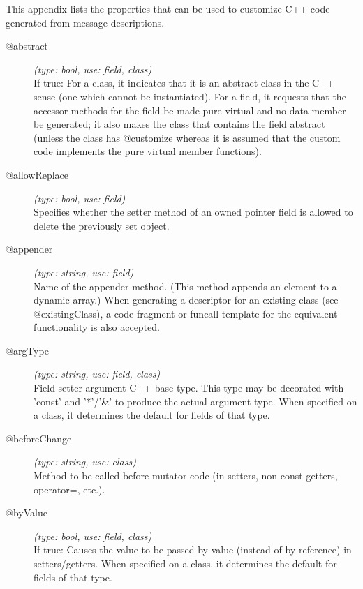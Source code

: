 \label{cha:msg-properties}

This appendix lists the properties that can be used to customize C++ code
generated from message descriptions.

%
%

\begin{description}
\item[@abstract] \textit{(type: bool, use: field, class)} \\
  If true: For a class, it indicates that it is an abstract class in the C++
  sense (one which cannot be instantiated). For a field, it requests that the
  accessor methods for the field be made pure virtual and no data member be
  generated; it also makes the class that contains the field abstract (unless
  the class has @customize whereas it is assumed that the custom code
  implements the pure virtual member functions).

\item[@allowReplace] \textit{(type: bool, use: field)} \\
  Specifies whether the setter method of an owned pointer field is allowed to
  delete the previously set object.

\item[@appender] \textit{(type: string, use: field)} \\
  Name of the appender method. (This method appends an element to a dynamic
  array.) When generating a descriptor for an existing class (see
  @existingClass), a code fragment or funcall template for the equivalent
  functionality is also accepted.

\item[@argType] \textit{(type: string, use: field, class)} \\
  Field setter argument C++ base type. This type may be decorated with 'const'
  and '*'/'\&' to produce the actual argument type. When specified on a class,
  it determines the default for fields of that type.

\item[@beforeChange] \textit{(type: string, use: class)} \\
  Method to be called before mutator code (in setters, non-const getters,
  operator=, etc.).

\item[@byValue] \textit{(type: bool, use: field, class)} \\
  If true: Causes the value to be passed by value (instead of by reference) in
  setters/getters. When specified on a class, it determines the default for
  fields of that type.


\end{description}
